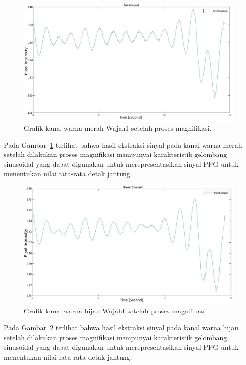 \begin{figure}[ht]
	\vspace{0.5em}
	\centering
	\includegraphics[width=\textwidth,height=0.25\textheight]{Red_channel_wajah1-result}
	\caption{Grafik kanal warna merah Wajah1 setelah proses magnifikasi.}
	\label{fig:grafik-red-wajah1-result}   
\end{figure}
Pada Gambar~\ref{fig:grafik-red-wajah1-result} terlihat bahwa hasil ekstraksi sinyal pada kanal warna merah setelah dilakukan proses magnifikasi mempunyai karakteristik gelombang sinusoidal yang dapat digunakan untuk merepresentasikan sinyal PPG untuk menentukan nilai rata-rata detak jantung.
\newpage
\begin{figure}[ht]
	\vspace{0.5em}
	\centering
	\includegraphics[width=\textwidth,height=0.25\textheight]{Green_channel_wajah1-result}
	\caption{Grafik kanal warna hijau Wajah1 setelah proses magnifikasi.}
	\label{fig:grafik-green-wajah1-result}   
\end{figure}
Pada Gambar~\ref{fig:grafik-green-wajah1-result} terlihat bahwa hasil ekstraksi sinyal pada kanal warna hijau setelah dilakukan proses magnifikasi mempunyai karakteristik gelombang sinusoidal yang dapat digunakan untuk merepresentasikan sinyal PPG untuk menentukan nilai rata-rata detak jantung.

